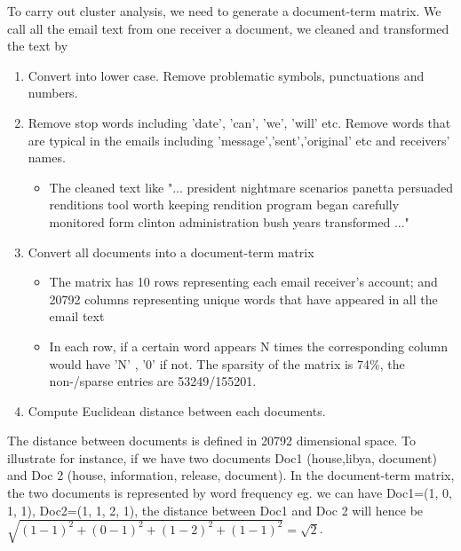 To carry out cluster analysis, we need to generate a document-term matrix. 
We call all the email text from one receiver a document, we cleaned and transformed the text by 
\begin{enumerate}
\item Convert into lower case. Remove problematic symbols, punctuations and numbers.
\item Remove stop words including 'date', 'can', 'we', 'will' etc. Remove words that are typical in the emails including 'message','sent','original' etc and receivers' names.
\begin{itemize}
\item The cleaned text like "... president nightmare scenarios panetta persuaded renditions tool worth keeping rendition program began carefully monitored form clinton administration bush years transformed ..."
\end{itemize}
\item Convert all documents into a document-term matrix
\begin{itemize} 
\item The matrix has 10 rows representing each email receiver's account; and 20792 columns representing unique words that have appeared in all the email text
\item In each row, if a certain word appears N times the corresponding column would have 'N' , '0' if not. The sparsity of the matrix is 74\%, the non-/sparse entries are 53249/155201. 
\end{itemize}
\item Compute Euclidean distance between each documents.
\end{enumerate}
The distance between documents is defined in 20792 dimensional space. To illustrate for instance, if we have two documents Doc1 (house,libya, document) and Doc 2 (house, information, release, document). In the document-term matrix, the two documents is represented by word frequency eg. we can have Doc1=(1, 0, 1, 1), Doc2=(1, 1, 2, 1), the distance between Doc1 and Doc 2 will hence be $\sqrt{(1-1)^{2} + (0-1)^{2} + (1-2)^{2} + (1-1)^{2}} = \sqrt{2}$.

